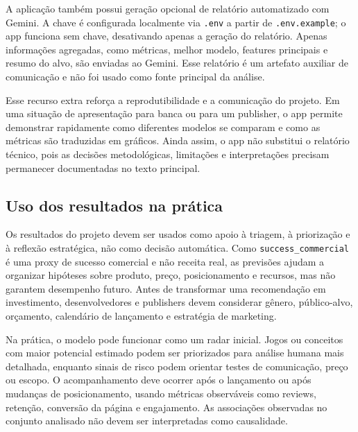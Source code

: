 \documentclass[12pt]{article}
\begin{document}
A aplicação também possui geração opcional de relatório automatizado com Gemini. A chave é configurada localmente via \texttt{.env} a partir de \texttt{.env.example}; o app funciona sem chave, desativando apenas a geração do relatório. Apenas informações agregadas, como métricas, melhor modelo, features principais e resumo do alvo, são enviadas ao Gemini. Esse relatório é um artefato auxiliar de comunicação e não foi usado como fonte principal da análise.

Esse recurso extra reforça a reprodutibilidade e a comunicação do projeto. Em uma situação de apresentação para banca ou para um publisher, o app permite demonstrar rapidamente como diferentes modelos se comparam e como as métricas são traduzidas em gráficos. Ainda assim, o app não substitui o relatório técnico, pois as decisões metodológicas, limitações e interpretações precisam permanecer documentadas no texto principal.


\subsection{Uso dos resultados na prática}

Os resultados do projeto devem ser usados como apoio à triagem, à priorização e à reflexão estratégica, não como decisão automática. Como \texttt{success\_commercial} é uma proxy de sucesso comercial e não receita real, as previsões ajudam a organizar hipóteses sobre produto, preço, posicionamento e recursos, mas não garantem desempenho futuro. Antes de transformar uma recomendação em investimento, desenvolvedores e publishers devem considerar gênero, público-alvo, orçamento, calendário de lançamento e estratégia de marketing.

Na prática, o modelo pode funcionar como um radar inicial. Jogos ou conceitos com maior potencial estimado podem ser priorizados para análise humana mais detalhada, enquanto sinais de risco podem orientar testes de comunicação, preço ou escopo. O acompanhamento deve ocorrer após o lançamento ou após mudanças de posicionamento, usando métricas observáveis como reviews, retenção, conversão da página e engajamento. As associações observadas no conjunto analisado não devem ser interpretadas como causalidade.
\end{document}
